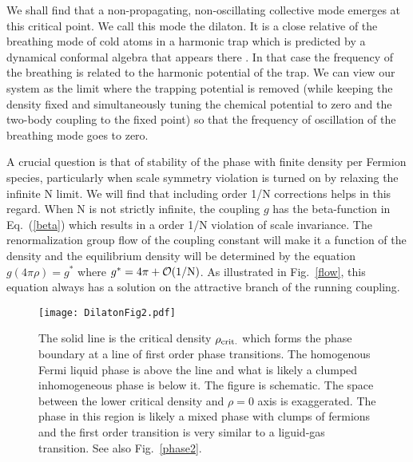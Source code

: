 \documentclass[twocolumn,secnumarabic,amssymb, nobibnotes, aps, prd]{revtex4}
\begin{document}
We shall find that a non-propagating, non-oscillating collective mode emerges at this critical point.  We call this mode  
the dilaton.  It is a close relative  of the
breathing mode of cold atoms in a harmonic trap which is predicted by  a dynamical conformal algebra that appears there  \cite{Pitaevskii}.  
In that case the frequency of the breathing
is related to the harmonic potential of the trap. We can view our system as the limit where the trapping potential is removed (while keeping the
density fixed and simultaneously tuning the chemical potential to zero and the two-body coupling to the fixed point)
so that the frequency of oscillation of the breathing mode goes to zero. 

A crucial question  is that of stability of the phase with finite density per Fermion species, particularly when  scale symmetry violation is
turned on by relaxing the infinite N limit.   
We will find
that including order 1/N corrections helps in this regard.    When N is not strictly
infinite, the coupling $g$ has the beta-function in Eq.\  (\ref{beta}) which results in a order 1/N
violation of scale invariance.  The renormalization group flow of the
 coupling constant will make it a  
 function of the density and the equilibrium density will be determined by the equation 
 $g(4\pi\rho)=g^*$ where $g^*=4\pi+{\mathcal O}(1/{\rm N})$.  As illustrated in Fig.\ \ref{flow},
 this equation always has a solution on the attractive branch of the running coupling. 
 

\begin{figure}
\texttt{[image: DilatonFig2.pdf]}\\
\begin{caption} {   The solid line is the critical density $\rho_{\rm crit.}$ which forms the 
phase boundary at a line of first order phase transitions.  The  homogenous Fermi liquid phase
  is above the line and what is likely a clumped inhomogeneous phase is below it. The figure is schematic.  The
space between the lower critical density and $\rho=0$ axis is exaggerated.  The phase in this region is likely a mixed phase with clumps of fermions and the first order transition is very similar to a liguid-gas transition. 
See  also Fig.\ \ref{phase2}.
\label{phase}  
}\end{caption}
 \end{figure}  
 
\end{document}
